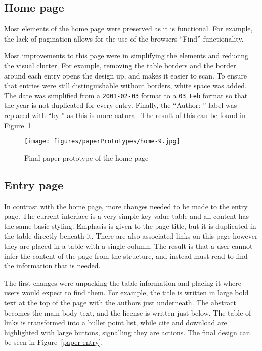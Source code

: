 \documentclass[bsc,frontabs,oneside,singlespacing,parskip,deptreport,logo]{infthesis}
\begin{document}
\subsection{Home page}

Most elements of the home page were preserved as it is functional. For example, the lack of pagination allows for the use of the browsers ``Find'' functionality. 

Most improvements to this page were in simplifying the elements and reducing the visual clutter. For example, removing the table borders and the border around each entry opens the design up, and makes it easier to scan. To ensure that entries were still distinguishable without borders, white space was added. The date was simplified from a \verb|2001-02-03| format to a \verb|03 Feb| format so that the year is not duplicated for every entry. Finally, the ``Author: '' label was replaced with ``by '' as this is more natural. The result of this can be found in Figure~\ref{paper-home}

\begin{figure}[h]
    \centering
    \texttt{[image: figures/paperPrototypes/home-9.jpg]}
    \caption{Final paper prototype of the home page}
    \label{paper-home}
\end{figure}

\subsection{Entry page}

In contrast with the home page, more changes needed to be made to the entry page. The current interface is a very simple key-value table and all content has the same basic styling. Emphasis is given to the page title, but it is duplicated in the table directly beneath it. There are also associated links on this page however they are placed in a table with a single column. The result is that a user cannot infer the content of the page from the structure, and instead must read to find the information that is needed.

The first changes were unpacking the table information and placing it where users would expect to find them. For example, the title is written in large bold text at the top of the page with the authors just underneath. The abstract becomes the main body text, and the license is written just below. The table of links is transformed into a bullet point list, while cite and download are highlighted with large buttons, signalling they are actions. The final design can be seen in Figure~\ref{paper-entry}.
\end{document}
